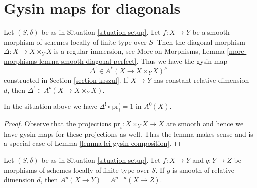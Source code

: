 \section{Gysin maps for diagonals}
\label{section-gysin-for-diagonal}

\noindent
Let $(S, \delta)$ be as in Situation \ref{situation-setup}. Let $f : X \to Y$
be a smooth morphism of schemes locally of finite type over $S$. Then the
diagonal morphism $\Delta : X \longrightarrow X \times_Y X$
is a regular immersion, see
More on Morphisms, Lemma \ref{more-morphisms-lemma-smooth-diagonal-perfect}.
Thus we have the gysin map
$$
\Delta^! \in A^*(X \to X \times_Y X)^\wedge
$$
constructed in Section \ref{section-koszul}. If $X \to Y$ has constant
relative dimension $d$, then $\Delta^! \in A^d(X \to X \times_Y X)$.

\begin{lemma}
\label{lemma-diagonal-identity}
In the situation above we have $\Delta^! \circ \text{pr}_i^! = 1$ in $A^0(X)$.
\end{lemma}

\begin{proof}
Observe that the projections $\text{pr}_i : X \times_Y X \to X$ are
smooth and hence we have gysin maps for these projections as well.
Thus the lemma makes sense and is a special case of
Lemma \ref{lemma-lci-gysin-composition}.
\end{proof}

\begin{proposition}
\label{proposition-compute-bivariant}
\begin{reference}
\cite[Proposition 17.4.2]{F}
\end{reference}
Let $(S, \delta)$ be as in Situation \ref{situation-setup}.
Let $f : X \to Y$ and $g : Y \to Z$ be morphisms of schemes locally
of finite type over $S$. If $g$ is smooth of relative dimension $d$, then
$A^p(X \to Y) = A^{p - d}(X \to Z)$.
\end{proposition}

